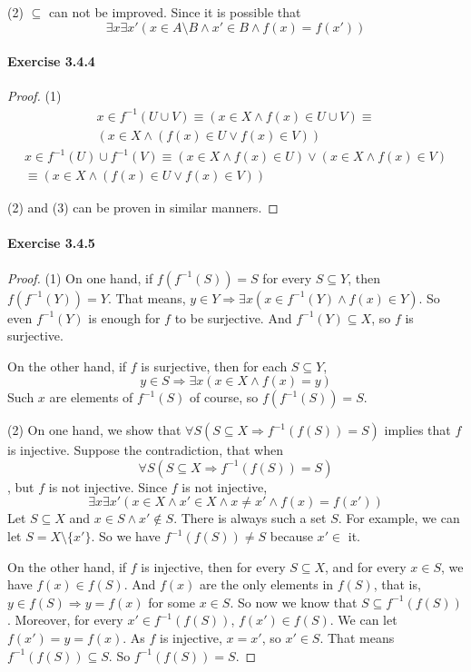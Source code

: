 (2) $\subseteq$ can not be improved. Since it is possible that
\[
\exists x \exists x'(x \in A \setminus B \wedge x' \in B \wedge f(x) = f(x'))
\]

\paragraph{Exercise 3.4.4} \label{exercise3.4.4}
\begin{proof}
(1) 
\begin{align*}
x \in f^{-1}(U \cup V) \equiv (x \in X \wedge f(x) \in U \cup V) \equiv \\
(x \in X \wedge (f(x) \in U \vee f(x) \in V))
\end{align*}
\begin{align*}
x \in  f^{-1}(U) \cup  f^{-1}(V) \equiv (x \in X \wedge f(x) \in U) \vee (x \in X \wedge f(x) \in V) \\
\equiv (x \in X \wedge (f(x) \in U \vee f(x) \in V))
\end{align*}

(2) and (3) can be proven in similar manners. 
\end{proof}

\paragraph{Exercise 3.4.5} \label{exercise3.4.5}
\begin{proof}
(1) On one hand, if $f(f^{-1}(S)) = S$ for every $S \subseteq Y$, then \\
$f(f^{-1}(Y)) = Y$. That means, 
$y \in Y \Longrightarrow \exists x (x \in f^{-1}(Y) \wedge f(x) \in Y)$. So even $f^{-1}(Y)$ 
is enough for $f$ to be surjective. And $f^{-1}(Y) \subseteq X$, so $f$ is surjective.

On the other hand, if $f$ is surjective, then for each $S \subseteq Y$, 
\[
y \in S \Longrightarrow \exists x(x \in X \wedge f(x) = y)
\]
Such $x$ are elements of $f^{-1}(S)$ of course, so $f(f^{-1}(S)) = S$.

(2) On one hand, we show that $\forall S(S \subseteq X \Longrightarrow f^{-1}(f(S)) = S)$ implies that 
$f$ is injective. Suppose the contradiction, that when 
\[
\forall S(S \subseteq X \Longrightarrow f^{-1}(f(S)) = S)
\], but $f$ is not injective. Since $f$ is not injective, 
\[
\exists x \exists x'(x \in X \wedge x' \in X \wedge x \neq x' \wedge f(x) = f(x'))
\]
Let $S \subseteq X$ and $x \in S \wedge x' \notin S$. There is always such a set $S$.
For example, we can let $S = X\setminus \{x'\}$. So we have $f^{-1}(f(S)) \neq S$ because $x' \in$ it.

On the other hand, if $f$ is injective, then for every $S \subseteq X$, and for every $x \in S$, we have 
$f(x) \in f(S)$. And $f(x)$ are the only elements in $f(S)$, that is, 
$y \in f(S) \Longrightarrow y = f(x)$ for some $x \in S$. So now we know that 
$S \subseteq f^{-1}(f(S))$. Moreover, for every $x' \in f^{-1}(f(S))$, $f(x') \in f(S)$. We can let 
$f(x') = y = f(x)$. As $f$ is injective, $x = x'$, so $x' \in S$. That means $f^{-1}(f(S)) \subseteq S$. 
So $f^{-1}(f(S)) =  S$.
\end{proof}

